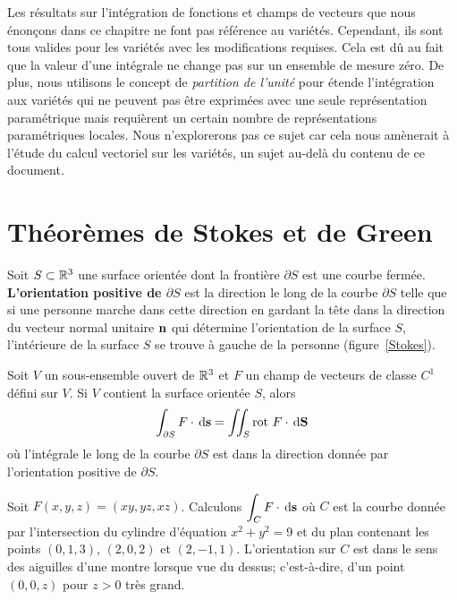 {Les résultats sur l'intégration de fonctions et champs de vecteurs que
nous énonçons dans ce chapitre ne font pas référence au variétés.
Cependant, ils sont tous valides pour les variétés avec les
modifications requises.  Cela est dû au fait que la valeur d'une
intégrale ne change pas sur un ensemble de \lgm mesure zéro\rgm.  De
plus, nous utilisons le concept de {\em partition de l'unité} pour étende
l'intégration aux variétés qui ne peuvent pas être exprimées avec une
seule représentation paramétrique mais requièrent un certain nombre de
représentations paramétriques locales.  Nous n'explorerons pas ce
sujet car cela nous amènerait à l'étude du calcul vectoriel sur les
variétés, un sujet au-delà du contenu de ce document.

\section{Théorèmes de Stokes et de Green}

Soit $S \subset \mathbb{R}^3$ une surface orientée dont la frontière
$\partial S$ est une courbe fermée.  {\bfseries L'orientation positive
de $\partial S$} est la direction le long de la courbe $\partial S$
telle que si une personne marche dans cette direction en gardant la
tête dans la direction du vecteur normal unitaire $\mathbf{n}$ qui
détermine l'orientation de la surface $S$, l'intérieure de la surface
$S$ se trouve à gauche de la personne (figure~\ref{Stokes}).

\begin{theorem}
Soit $V$ un sous-ensemble ouvert de $\mathbb{R}^3$ et $F$ un champ de
vecteurs de classe $C^1$ défini sur $V$.  Si $V$ contient la surface
orientée $S$, alors
\begin{equation} \label{Stokes_equ}
\int_{\partial S} F\cdot \,\mathrm{d}\mathbf{s}
= \iint_S \operatorname{rot}\,F \cdot \,\mathrm{d}\mathbf{S}
\end{equation}
où l'intégrale le long de la courbe $\partial S$ est dans la direction 
donnée par l'orientation positive de $\partial S$.
\end{theorem}


\begin{egg}
Soit $F(x,y,z) = (xy, yz, xz)$.  Calculons
$\displaystyle \int_C F \cdot \,\mathrm{d}\mathbf{s}$
où $C$ est la courbe donnée par l'intersection du cylindre d'équation
$x^2 + y^2 =9$ et du plan contenant les points $(0,1,3)$, $(2,0,2)$ et
$(2,-1,1)$.  L'orientation sur $C$ est dans le sens des aiguilles
d'une montre lorsque vue du dessus; c'est-à-dire, d'un point $(0,0,z)$
pour $z>0$ très grand.


\end{egg}}

